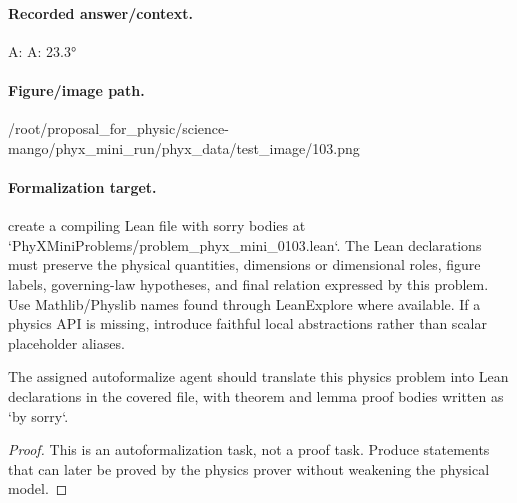 \paragraph{Recorded answer/context.}
A: A: 23.3°

\paragraph{Figure/image path.}
/root/proposal\_for\_physic/science-mango/phyx\_mini\_run/phyx\_data/test\_image/103.png

\paragraph{Formalization target.}
create a compiling Lean file with sorry bodies at `PhyXMiniProblems/problem\_phyx\_mini\_0103.lean`. The Lean declarations must preserve the physical quantities, dimensions or dimensional roles, figure labels, governing-law hypotheses, and final relation expressed by this problem.
Use Mathlib/Physlib names found through LeanExplore where available. If a physics API is missing, introduce faithful local abstractions rather than scalar placeholder aliases.

\begin{theorem}
\label{thm:physics:phyx_mini_0103:target}
The assigned autoformalize agent should translate this physics problem into Lean declarations in the covered file, with theorem and lemma proof bodies written as `by sorry`.
\end{theorem}
\begin{proof}
This is an autoformalization task, not a proof task. Produce statements that can later be proved by the physics prover without weakening the physical model.
\end{proof}

